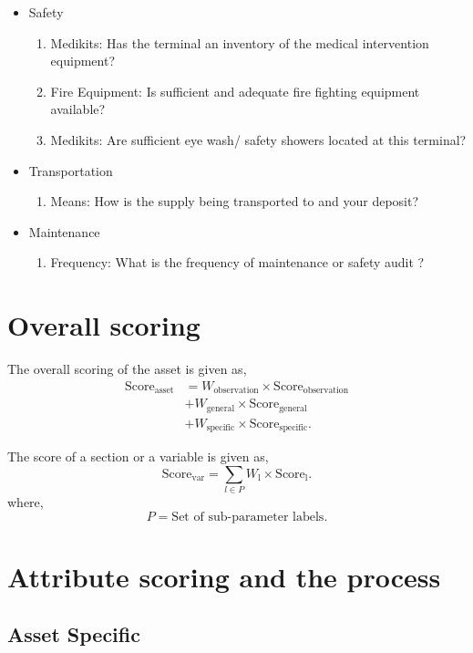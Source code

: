 \documentclass[oneside,twocolumn]{article}
\newcommand{\tsub}[2]{\text{#1}_{\text{#2}}}
\newcommand{\tsubb}[2]{#1_{\text{#2}}}
\begin{document}
\begin{itemize}
\begin{itemize}
\item Safety
\begin{enumerate}
\item Medikits: Has the terminal an inventory of the medical intervention equipment?
\item Fire Equipment: Is sufficient and adequate fire fighting equipment available?
\item Medikits: Are sufficient eye wash/ safety showers located at this terminal?
\end{enumerate}

\item Transportation
\begin{enumerate}
\item Means: How is the supply being transported to and your deposit?
\end{enumerate}

\item Maintenance
\begin{enumerate}
\item Frequency: What is the frequency of  maintenance or safety audit ?
\end{enumerate}

\end{itemize}

    \end{itemize}
\section{Overall scoring}
The overall scoring of the asset is given as,
\begin{align*}
	\tsub{Score}{asset} &= \tsubb{W}{observation} \times \tsub{Score}{observation} \\
	&+ \tsubb{W}{general} \times \tsub{Score}{general} \\
	&+ \tsubb{W}{specific} \times \tsub{Score}{specific}.
\end{align*}

The score of a section or a variable is given as,
\[
	\tsub{Score}{var} = \sum_{l \in P} \tsubb{W}{l} \times \tsub{Score}{l}.
\]
where,
\[
	P = \text{Set of sub-parameter labels.}
\]
\section{Attribute scoring and the
process}
\subsection{Asset Specific}
\end{document}
